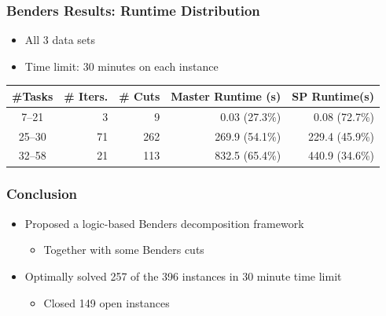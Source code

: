 \documentclass{beamer}
\begin{document}
\begin{frame}
\frametitle{Benders Results: Runtime Distribution}
\begin{itemize}
	\item All 3 data sets\vspace{1mm}
	\item Time limit: 30 minutes on each instance
\end{itemize}
\begin{table}
	\centering
	\begin{tabular}{crrrr}
		\toprule
		\#Tasks & \# Iters. & \# Cuts & Master Runtime (s) & SP Runtime(s) \\\midrule\midrule
		7--21 & 3 & 9 & 0.03 (27.3\%) & 0.08 (72.7\%) \\
		25--30 & 71 & 262 & 269.9 (54.1\%) & 229.4 (45.9\%) \\
		32--58 & 21 & 113 & 832.5 (65.4\%) & 440.9 (34.6\%) \\
		\bottomrule
	\end{tabular}
\end{table}
\end{frame}

\begin{frame}
\frametitle{Conclusion}
\begin{itemize}
	\item Proposed a logic-based Benders decomposition framework\vspace{2mm}
	\begin{itemize}
		\item Together with some Benders cuts\vspace{3mm}
	\end{itemize}\pause
	\item Optimally solved 257 of the 396 instances in 30 minute time limit\vspace{2mm}
	\begin{itemize}
		\item {\color{red} Closed 149 open instances}
	\end{itemize}
\end{itemize}
\end{frame}
\end{document}
